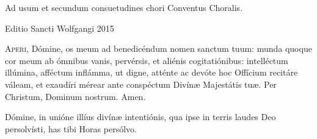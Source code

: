 \documentclass[a4paper, twoside, 12pt]{article}
\newcommand{\annusEditionis}{2015}
\begin{document}

\def\greinitialformat#1{%
{\color{red}\fontsize{38}{38}\selectfont #1}%
}

\pagestyle{empty}

\begin{titulusOfficii}
\end{titulusOfficii}

\vspace{1.5cm}
\begin{center}
\end{center}

\vfill

\begin{center}
Ad usum et secundum consuetudines chori \guillemotright{}Conventus Choralis\guillemotleft.

Editio Sancti Wolfgangi \annusEditionis
\end{center}

\pagebreak

\renewcommand{\headrulewidth}{0pt} %
\fancyhf{}
\pagestyle{fancy}


\lettrine{{\color{red}A}}{peri,} Dómine, os meum ad benedicéndum nomen sanctum tuum:
munda quoque cor meum ab ómnibus vanis, pervérsis, et aliénis
cogitatiónibus:
intelléctum illúmina, afféctum inflámma,
ut digne, atténte ac devóte hoc Offícium recitáre váleam,
et exaudíri mérear ante conspéctum Divínæ Majestátis tuæ.
Per Christum, Dominum nostrum.
\Rbardot{} Amen.

Dómine, in unióne illíus divínæ intentiónis,
qua ipse in terris laudes Deo persolvísti,
has tibi Horas  persólvo.

\trOratioAnteOfficium

\vfill


\end{document}
